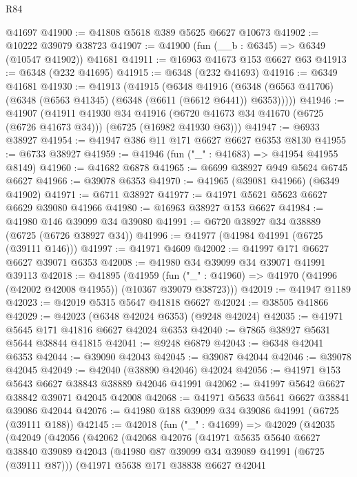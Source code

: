 \begin{lexlean}{R84}
\begin{coremodule}
    @41697
@41900 := @41808 @5618 @389 @5625 @6627 @10673
@41902 := @10222 @39079 @38723
@41907 := @41900 (fun (__b : @6345) => @6349 (@10547 @41902)) @41681
@41911 := @16963 @41673 @153 @6627 @63
@41913 := @6348 (@232 @41695)
@41915 := @6348 (@232 @41693)
@41916 := @6349 @41681
@41930 := @41913
    (@41915
      (@6348
        @41916
        (@6348 (@6563 @41706) (@6348 (@6563 @41345) (@6348 (@6611 (@6612 @6441)) @6353)))))
@41946 := @41907
    (@41911
      @41930
      @34
      @41916
      (@6720 @41673 @34 @41670 (@6725 (@6726 @41673 @34)))
      (@6725 (@16982 @41930 @63)))
@41947 := @6933 @38927
@41954 := @41947 @386 @11 @171 @6627 @6627 @6353 @8130
@41955 := @6733 @38927
@41959 := @41946 (fun ("_" : @41683) => @41954 @41955 @8149)
@41960 := @41682 @6878
@41965 := @6699 @38927 @949 @5624 @6745 @6627
@41966 := @39078 @6353
@41970 := @41965 (@39081 @41966) (@6349 @41902)
@41971 := @6711 @38927
@41977 := @41971 @5621 @5623 @6627 @6629 @39080 @41966
@41980 := @16963 @38927 @153 @6627
@41984 := @41980 @146 @39099 @34 @39080
@41991 := @6720 @38927 @34 @38889 (@6725 (@6726 @38927 @34))
@41996 := @41977 (@41984 @41991 (@6725 (@39111 @146)))
@41997 := @41971 @4609
@42002 := @41997 @171 @6627 @6627 @39071 @6353
@42008 := @41980 @34 @39099 @34 @39071 @41991 @39113
@42018 := @41895
    (@41959 (fun ("_" : @41960) => @41970 (@41996 (@42002 @42008 @41955)) (@10367 @39079 @38723)))
@42019 := @41947 @1189
@42023 := @42019 @5315 @5647 @41818 @6627
@42024 := @38505 @41866
@42029 := @42023 (@6348 @42024 @6353) (@9248 @42024)
@42035 := @41971 @5645 @171 @41816 @6627 @42024 @6353
@42040 := @7865 @38927 @5631 @5644 @38844 @41815
@42041 := @9248 @6879
@42043 := @6348 @42041 @6353
@42044 := @39090 @42043
@42045 := @39087 @42044
@42046 := @39078 @42045
@42049 := @42040 (@38890 @42046) @42024
@42056 := @41971 @153 @5643 @6627 @38843 @38889 @42046 @41991
@42062 := @41997 @5642 @6627 @38842 @39071 @42045 @42008
@42068 := @41971 @5633 @5641 @6627 @38841 @39086 @42044
@42076 := @41980 @188 @39099 @34 @39086 @41991 (@6725 (@39111 @188))
@42145 := @42018
    (fun ("_" : @41699) =>
    @42029
      (@42035
        (@42049
          (@42056
            (@42062
              (@42068
                @42076
                (@41971
                  @5635
                  @5640
                  @6627
                  @38840
                  @39089
                  @42043
                  (@41980 @87 @39099 @34 @39089 @41991 (@6725 (@39111 @87)))
                  (@41971
                    @5638
                    @171
                    @38838
                    @6627
                    @42041

\end{coremodule}
\end{lexlean}
